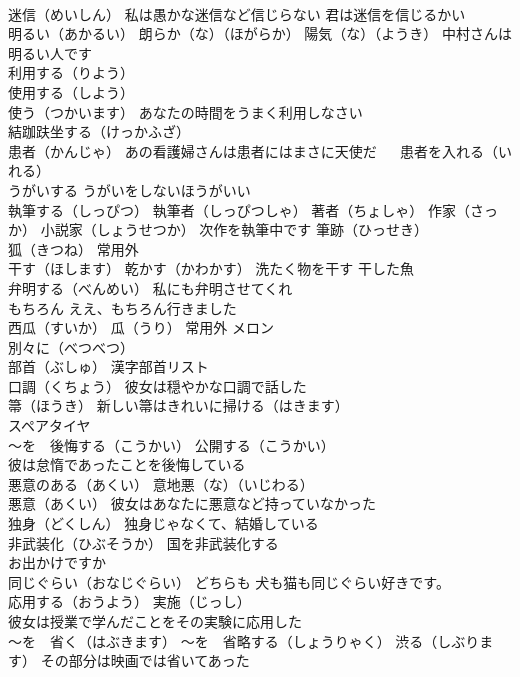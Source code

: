 \documentclass[8pt]{extreport}
\begin{document}
\begin{CJK}{UTF8}{min}
\\	迷信（めいしん） 私は愚かな迷信など信じらない 君は迷信を信じるかい
\\	明るい（あかるい） 朗らか（な）（ほがらか） 陽気（な）（ようき） 中村さんは明るい人です
\\	利用する（りよう）
\\	使用する（しよう）
\\	使う（つかいます） あなたの時間をうまく利用しなさい
\\	結跏趺坐する（けっかふざ）
\\	患者（かんじゃ） あの看護婦さんは患者にはまさに天使だ 　 患者を入れる（いれる）
\\	うがいする うがいをしないほうがいい
\\	執筆する（しっぴつ） 執筆者（しっぴつしゃ） 著者（ちょしゃ） 作家（さっか） 小説家（しょうせつか） 次作を執筆中です 筆跡（ひっせき）
\\	狐（きつね） 常用外
\\	干す（ほします） 乾かす（かわかす） 洗たく物を干す 干した魚
\\	弁明する（べんめい） 私にも弁明させてくれ
\\	もちろん ええ、もちろん行きました
\\	西瓜（すいか） 瓜（うり） 常用外 メロン
\\	別々に（べつべつ）
\\	部首（ぶしゅ） 漢字部首リスト
\\	口調（くちょう） 彼女は穏やかな口調で話した
\\	箒（ほうき） 新しい箒はきれいに掃ける（はきます）
\\	スペアタイヤ
\\	～を　後悔する（こうかい） 公開する（こうかい） 
\\	彼は怠惰であったことを後悔している
\\	悪意のある（あくい） 意地悪（な）（いじわる）
\\	悪意（あくい） 彼女はあなたに悪意など持っていなかった
\\	独身（どくしん） 独身じゃなくて、結婚している
\\	非武装化（ひぶそうか） 国を非武装化する
\\	お出かけですか
\\	同じぐらい（おなじぐらい） どちらも 犬も猫も同じぐらい好きです。
\\	応用する（おうよう） 実施（じっし）
\\	彼女は授業で学んだことをその実験に応用した
\\	～を　省く（はぶきます） ～を　省略する（しょうりゃく） 渋る（しぶります） その部分は映画では省いてあった

\end{CJK}
\end{document}

